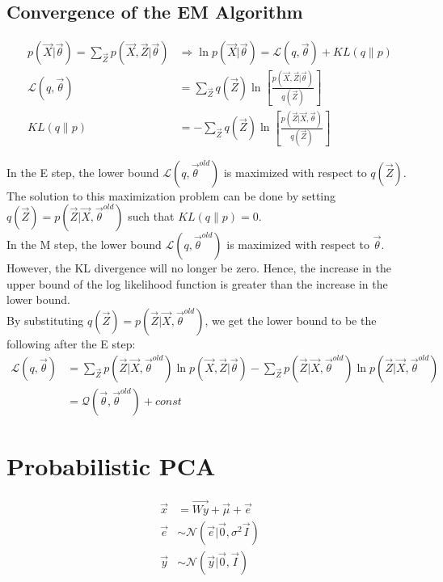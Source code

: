 \documentclass[12pt,twoside]{article}
\begin{document}
\subsection{Convergence of the EM Algorithm}

\begin{align*}
p(\vec{X} \vert \vec{\theta}) = \sum_{\vec{Z}} p(\vec{X},\vec{Z} \vert \vec{\theta}) &\Rightarrow \ln p(\vec{X} \vert \vec{\theta}) = \mathcal{L}(q, \vec{\theta}) + KL(q\parallel p)\\
\mathcal{L}(q, \vec{\theta})&=\sum_{\vec{Z}} q(\vec{Z})\ln \left[\frac{p(\vec{X}, \vec{Z}\vert \vec{\theta})}{q(\vec{Z})}\right]\\
 KL(q\parallel p)&=-\sum_{\vec{Z}} q(\vec{Z})\ln \left[\frac{p(\vec{Z}\vert \vec{X}, \vec{\theta})}{q(\vec{Z})}\right]
\end{align*}

In the E step, the lower bound $\mathcal{L}(q,\vec{\theta}^{old})$ is maximized with respect to $q(\vec{Z})$. The solution to this maximization problem can be done by setting $q(\vec{Z}) = p (\vec{Z}\vert \vec{X}, \vec{\theta}^{old})$ such that $KL(q\parallel p)=0$.\\

In the M step, the lower bound $\mathcal{L}(q,\vec{\theta}^{old})$ is maximized with respect to $\vec{\theta}$. However, the KL divergence will no longer be zero. Hence, the increase in the upper bound of the log likelihood function is greater than the increase in the lower bound.\\

By substituting $q(\vec{Z}) = p(\vec{Z}\vert\vec{X}, \vec{\theta}^{old})$, we get the lower bound to be the following after the E step:
\begin{align*}
\mathcal{L}(q,\vec{\theta}) & = \sum_{\vec{Z}}p(\vec{Z}\vert \vec{X}, \vec{\theta}^{old})\ln p(\vec{X},\vec{Z}\vert \vec{\theta}) - \sum_{\vec{Z}}p(\vec{Z}\vert \vec{X}, \vec{\theta}^{old})\ln p(\vec{Z} \vert \vec{X}, \vec{\theta}^{old})\\
&= \mathcal{Q}(\vec{\theta},\vec{\theta}^{old} ) + const 
\end{align*}


\newpage

\section{Probabilistic PCA}

\begin{align*}
\vec{x} &= \vec{Wy} + \vec{\mu} + \vec{e}\\
\vec{e} & \sim \mathcal{N}(\vec{e}\vert \vec{0}, \sigma^2\vec{I})\\
\vec{y} & \sim \mathcal{N}(\vec{y}\vert \vec{0}, \vec{I})
\end{align*}
\end{document}
